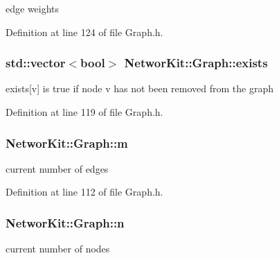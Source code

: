 edge weights 



Definition at line 124 of file Graph.\-h.

\hypertarget{class_networ_kit_1_1_graph_a3e97dc6389c8e8c80e8a561a55657c71}{
\subsubsection[{exists}]{\setlength{\rightskip}{0pt plus 5cm}std\-::vector$<$bool$>$ Networ\-Kit\-::\-Graph\-::exists\hspace{0.3cm}{\ttfamily [protected]}}}\label{class_networ_kit_1_1_graph_a3e97dc6389c8e8c80e8a561a55657c71}


exists\mbox{[}v\mbox{]} is true if node v has not been removed from the graph 



Definition at line 119 of file Graph.\-h.

\hypertarget{class_networ_kit_1_1_graph_a7017e2d146dcc5dbd9120c274300a99a}{
\subsubsection[{m}]{ Networ\-Kit\-::\-Graph\-::m\hspace{0.3cm}{\ttfamily [protected]}}}\label{class_networ_kit_1_1_graph_a7017e2d146dcc5dbd9120c274300a99a}


current number of edges 



Definition at line 112 of file Graph.\-h.

\hypertarget{class_networ_kit_1_1_graph_aae05e611d6d5eb42e045d374d73eb34a}{
\subsubsection[{n}]{ Networ\-Kit\-::\-Graph\-::n\hspace{0.3cm}{\ttfamily [protected]}}}\label{class_networ_kit_1_1_graph_aae05e611d6d5eb42e045d374d73eb34a}


current number of nodes 



